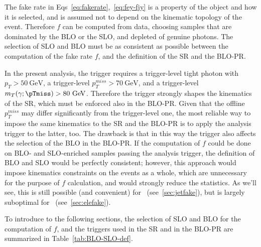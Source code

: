 The fake rate in Eqs~\ref{eq:fakerate},~\ref{eq:fey-fjy} is a property of the object and how it is selected, and is assumed not to depend on the kinematic topology of the event. Therefore $f$ can be computed from data, choosing samples that are dominated by the BLO or the SLO, and depleted of genuine photons. The selection of SLO and BLO must be as consistent as possible between the computation of the fake rate $f$, and the definition of the SR and the BLO-PR.

In the present analysis, the trigger requires a trigger-level tight photon with $p_T>50~\mathrm{GeV}$, a trigger-level $p_T^{miss}>70~\mathrm{GeV}$, and a trigger-level $m_T(\gamma;\pTmiss)>80~\mathrm{GeV}$. Therefore the trigger strongly shapes the kinematics of the SR, which must be enforced also in the BLO-PR. Given that the offline $p_T^{miss}$ may differ significantly from the trigger-level one, the most reliable way to impose the same kinematics to the SR and the BLO-PR is to apply the analysis trigger to the latter, too. The drawback is that in this way the trigger also affects the selection of the BLO in the BLO-PR. If the computation of $f$ could be done on BLO- and SLO-enriched samples passing the analysis trigger, the definition of BLO and SLO would be perfectly consistent; however, this approach would impose kinematics constraints on the events as a whole, which are unnecessary for the purpose of $f$ calculation, and would strongly reduce the statistics. As we'll see, this is still possible (and convenient) for \jfakey\ (see~\ref{sec:jetfake}), but is largely suboptimal for \efakey\ (see~\ref{sec:elefake}).

To introduce to the following sections, the selection of SLO and BLO for the computation of $f$, and the triggers used in the SR and in the BLO-PR are summarized in Table~\ref{tab:BLO-SLO-def}.


